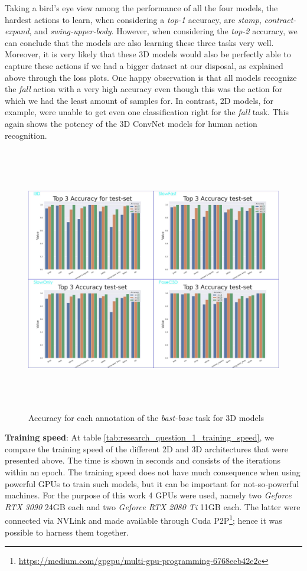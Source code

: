 \documentclass[extern,palatino]{cgMA}
\begin{document}
\bigskip
\noindent Taking a bird's eye view among the performance of all the four models, the hardest actions to learn, when considering a \textit{top-1} accuracy, are \textit{stamp}, \textit{contract-expand}, and \textit{swing-upper-body}. However, when considering the \textit{top-2} accuracy, we can conclude that the models are also learning these three tasks very well. Moreover, it is very likely that these 3D models would also be perfectly able to capture these actions if we had a bigger dataset at our disposal, as explained above through the loss plots. One happy observation is that all models recognize the \textit{fall} action with a very high accuracy even though this was the action for which we had the least amount of samples for. In contrast, 2D models, for example, were unable to get even one classification right for the \textit{fall} task. This again shows the potency of the 3D ConvNet models for human action recognition.

\begin{figure}[h]
\center
\includegraphics[height={330pt}, width={440pt}]{Thesis/images/3D_acc_per_class.jpg}
\caption{Accuracy for each annotation of the \textit{bast-base} task for 3D models}
\label{fig:3d_models_top_class_accuracy}
\end{figure}

\bigskip
\noindent\textbf{Training speed}: At table \ref{tab:research_question_1_training_speed}, we compare the training speed of the different 2D and 3D architectures that were presented above. The time is shown in seconds and consists of the iterations within an epoch. The training speed does not have much consequence when using powerful GPUs to train such models, but it can be important for not-so-powerful machines. For the purpose of this work 4 GPUs were used, namely two \textit{Geforce RTX 3090} 24GB each and two \textit{Geforce RTX 2080 Ti} 11GB each. The latter were connected via NVLink and made available through Cuda P2P\footnote{\url{https://medium.com/gpgpu/multi-gpu-programming-6768eeb42e2c}}; hence it was possible to harness them together.
\end{document}
